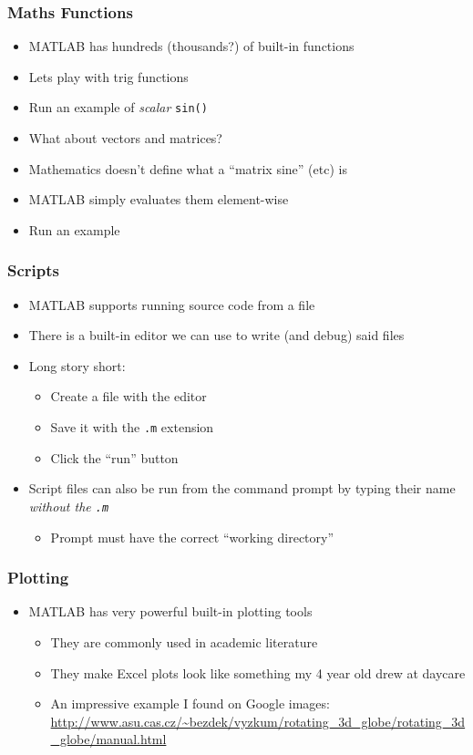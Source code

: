 \documentclass[14pt]{beamer}
\begin{document}
\begin{frame}
\frametitle{Maths Functions}
\begin{itemize}
\item MATLAB has hundreds (thousands?) of built-in functions
\item Lets play with trig functions
\item Run an example of \textit{scalar} \texttt{sin()}
\pause
\item What about vectors and matrices?
\pause
\item Mathematics doesn't define what a ``matrix sine'' (etc) is
\item MATLAB simply evaluates them element-wise
\item Run an example
\end{itemize}
\end{frame}

\begin{frame}
\frametitle{Scripts}
\begin{itemize}
\item MATLAB supports running source code from a file
\item There is a built-in editor we can use to write (and debug) said files
\item Long story short:
	\begin{itemize}
		\item Create a file with the editor
		\item Save it with the \texttt{.m} extension
		\item Click the ``run'' button
	\end{itemize}
\item Script files can also be run from the command prompt by typing their name \textit{without the \texttt{.m}}
	\begin{itemize}
		\item Prompt must have the correct ``working directory''
	\end{itemize}
\end{itemize}
\end{frame}

\begin{frame}
\frametitle{Plotting}
\begin{itemize}
\item MATLAB has very powerful built-in plotting tools
	\begin{itemize}
		\item They are commonly used in academic literature
		\item They make Excel plots look like something my 4 year old drew at daycare
		\item An impressive example I found on Google images: \url{http://www.asu.cas.cz/~bezdek/vyzkum/rotating_3d_globe/rotating_3d_globe/manual.html}
	\end{itemize}
\end{itemize}
\end{frame}
\end{document}
